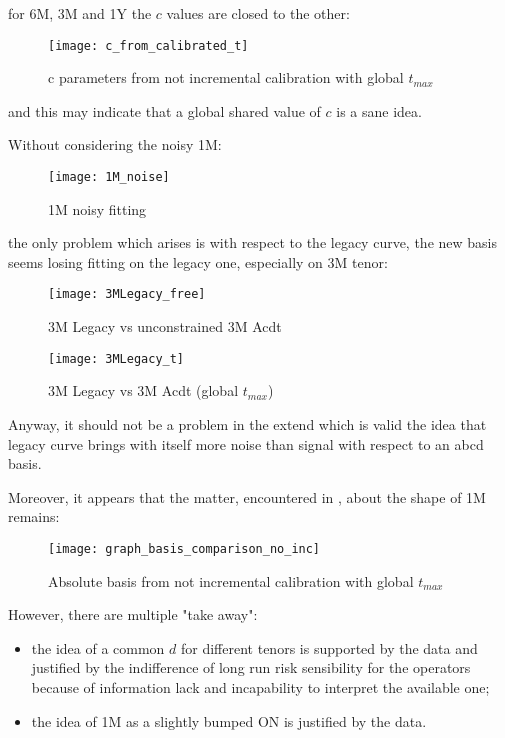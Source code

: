 for 6M, 3M and 1Y the $c$ values are closed to the other:

\begin{figure}[H]
\centering
\texttt{[image: c\_from\_calibrated\_t]}
\caption{c parameters from not incremental calibration with global $t_{max}$}
\label{fig:c_from_calibrated_t}
\end{figure}

and this may indicate that a global shared value of $c$ is a sane idea.


Without considering the noisy 1M:

\begin{figure}[H]
\centering
\texttt{[image: 1M\_noise]}
\caption{1M noisy fitting}
\label{fig:1M_noise}
\end{figure}

the only problem which arises is with respect to the legacy curve, the new basis seems losing fitting on the legacy one, especially on 3M tenor:

\begin{figure}[H]
\centering
\texttt{[image: 3MLegacy\_free]}
\caption{3M Legacy vs unconstrained 3M Acdt}
\label{fig:3MLegacy_free}
\end{figure}

\begin{figure}[H]
\centering
\texttt{[image: 3MLegacy\_t]}
\caption{3M Legacy vs 3M Acdt (global $t_{max}$)}
\label{fig:3MLegacy_t}
\end{figure}

Anyway, it should not be a problem in the extend which is valid the idea that legacy curve brings with itself more noise than signal with respect to an abcd basis.


Moreover, it appears that the matter, encountered in \cite{ametrano_ballabio_mazzocchi}, about the shape of 1M remains:

\begin{figure}[H]
\centering
\texttt{[image: graph\_basis\_comparison\_no\_inc]}
\caption{Absolute basis from not incremental calibration with global $t_{max}$}
\label{fig:graph_basis_comparison_no_inc}
\end{figure}

However, there are multiple "take away":
\begin{itemize}
    \item the idea of a common $d$ for different tenors is supported by the data and justified by the indifference of long run risk sensibility for the operators because of information lack and incapability to interpret the available one;
    \item the idea of 1M as a slightly bumped ON is justified by the data.
\end{itemize}


